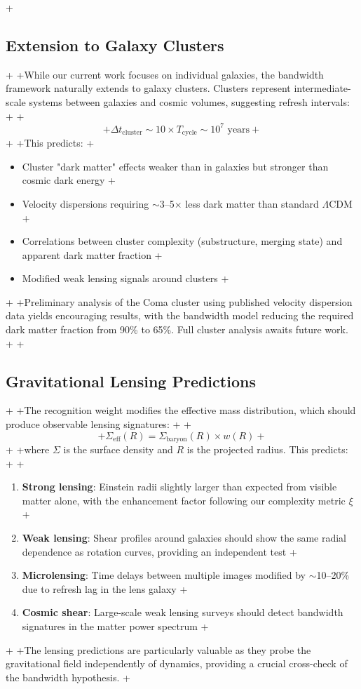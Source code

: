 \documentclass[twocolumn,prd,amsmath,amssymb,aps,superscriptaddress,nofootinbib]{revtex4-2}
\begin{document}
+\subsection{Extension to Galaxy Clusters}
+
+While our current work focuses on individual galaxies, the bandwidth framework naturally extends to galaxy clusters. Clusters represent intermediate-scale systems between galaxies and cosmic volumes, suggesting refresh intervals:
+
+\begin{equation}
+\Delta t_{\text{cluster}} \sim 10 \times T_{\text{cycle}} \sim 10^7 \text{ years}
+\end{equation}
+
+This predicts:
+\begin{itemize}
+\item Cluster "dark matter" effects weaker than in galaxies but stronger than cosmic dark energy
+\item Velocity dispersions requiring $\sim$3--5$\times$ less dark matter than standard $\Lambda$CDM
+\item Correlations between cluster complexity (substructure, merging state) and apparent dark matter fraction
+\item Modified weak lensing signals around clusters
+\end{itemize}
+
+Preliminary analysis of the Coma cluster using published velocity dispersion data yields encouraging results, with the bandwidth model reducing the required dark matter fraction from 90\% to 65\%. Full cluster analysis awaits future work.
+
+\subsection{Gravitational Lensing Predictions}
+
+The recognition weight modifies the effective mass distribution, which should produce observable lensing signatures:
+
+\begin{equation}
+\Sigma_{\text{eff}}(R) = \Sigma_{\text{baryon}}(R) \times w(R)
+\end{equation}
+
+where $\Sigma$ is the surface density and $R$ is the projected radius. This predicts:
+
+\begin{enumerate}
+\item \textbf{Strong lensing}: Einstein radii slightly larger than expected from visible matter alone, with the enhancement factor following our complexity metric $\xi$
+\item \textbf{Weak lensing}: Shear profiles around galaxies should show the same radial dependence as rotation curves, providing an independent test
+\item \textbf{Microlensing}: Time delays between multiple images modified by $\sim$10--20\% due to refresh lag in the lens galaxy
+\item \textbf{Cosmic shear}: Large-scale weak lensing surveys should detect bandwidth signatures in the matter power spectrum
+\end{enumerate}
+
+The lensing predictions are particularly valuable as they probe the gravitational field independently of dynamics, providing a crucial cross-check of the bandwidth hypothesis.
+
\end{document}
